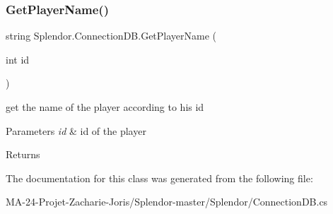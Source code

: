 \subsubsection{\texorpdfstring{Get\+Player\+Name()}{GetPlayerName()}}
{\footnotesize\ttfamily string Splendor.\+Connection\+D\+B.\+Get\+Player\+Name (\begin{DoxyParamCaption}\item[{int}]{id }\end{DoxyParamCaption})}



get the name of the player according to his id 


\begin{DoxyParams}{Parameters}
{\em id} & id of the player\\
\hline
\end{DoxyParams}
\begin{DoxyReturn}{Returns}

\end{DoxyReturn}


The documentation for this class was generated from the following file\+:\begin{DoxyCompactItemize}
\item 
M\+A-\/24-\/\+Projet-\/\+Zacharie-\/\+Joris/\+Splendor-\/master/\+Splendor/Connection\+D\+B.\+cs\end{DoxyCompactItemize}
